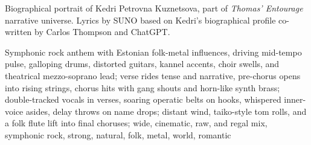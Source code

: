 
\begin{notes}
Biographical portrait of Kedri Petrovna Kuznetsova, part of \emph{Thomas’ Entourage} narrative universe. Lyrics by SUNO based on Kedri's biographical profile co-written by Carlos Thompson and ChatGPT.
\end{notes}
\begin{style}
Symphonic rock anthem with Estonian folk-metal influences, driving mid-tempo pulse, galloping drums, distorted guitars, kannel accents, choir swells, and theatrical mezzo-soprano lead; verse rides tense and narrative, pre-chorus opens into rising strings, chorus hits with gang shouts and horn-like synth brass; double-tracked vocals in verses, soaring operatic belts on hooks, whispered inner-voice asides, delay throws on name drops; distant wind, taiko-style tom rolls, and a folk flute lift into final choruses; wide, cinematic, raw, and regal mix, symphonic rock, strong, natural, folk, metal, world, romantic
\end{style}

